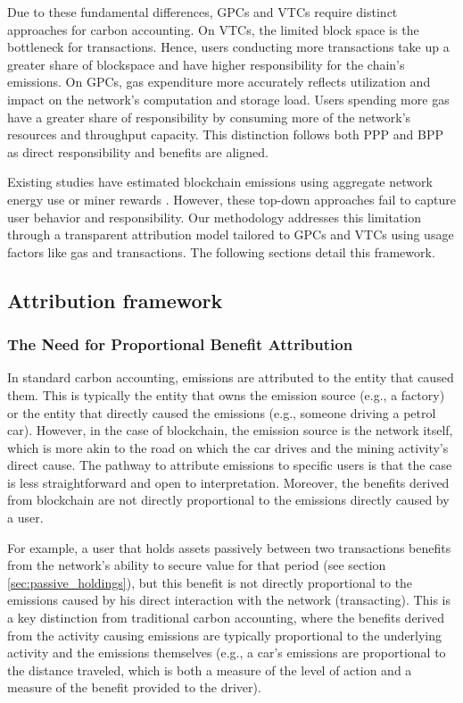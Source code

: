 \documentclass[11pt]{report}
\begin{document}
Due to these fundamental differences, GPCs and VTCs require distinct approaches for carbon accounting. On VTCs, the limited block space is the bottleneck for transactions. Hence, users conducting more transactions take up a greater share of blockspace and have higher responsibility for the chain's emissions. On GPCs, gas expenditure more accurately reflects utilization and impact on the network's computation and storage load. Users spending more gas have a greater share of responsibility by consuming more of the network's resources and throughput capacity. This distinction follows both \ac{PPP} and \ac{BPP} as direct responsibility and benefits are aligned.

Existing studies have estimated blockchain emissions using aggregate network energy use or miner rewards \cite{devriesCryptocurrenciesRoadSustainability2022,devriesRevisitingBitcoinCarbon2022,neumuellerCambridgeBitcoinElectricity2021,mcdonaldEthereumEmissionsBottomup2022}. However, these top-down approaches fail to capture user behavior and responsibility. Our methodology addresses this limitation through a transparent attribution model tailored to GPCs and VTCs using usage factors like gas and transactions. The following sections detail this framework.

\subsection{Attribution framework}
\subsubsection*{The Need for Proportional Benefit Attribution}
In standard carbon accounting, emissions are attributed to the entity that caused them. This is typically the entity that owns the emission source (e.g., a factory) or the entity that directly caused the emissions (e.g., someone driving a petrol car). However, in the case of blockchain, the emission source is the network itself, which is more akin to the road on which the car drives and the mining activity's direct cause. The pathway to attribute emissions to specific users is that the case is less straightforward and open to interpretation. Moreover, the benefits derived from blockchain are not directly proportional to the emissions directly caused by a user.

For example, a user that holds assets passively between two transactions benefits from the network's ability to secure value for that period (see section \ref{sec:passive_holdings}), but this benefit is not directly proportional to the emissions caused by his direct interaction with the network (transacting). This is a key distinction from traditional carbon accounting, where the benefits derived from the activity causing emissions are typically proportional to the underlying activity and the emissions themselves (e.g., a car's emissions are proportional to the distance traveled, which is both a measure of the level of action and a measure of the benefit provided to the driver).
\end{document}
